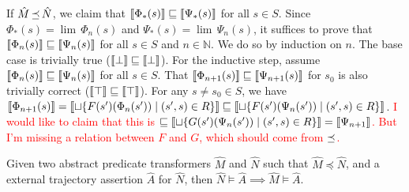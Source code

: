 If $\hat M \operatorname{\preceq} \hat N$, we claim that $\llbracket\Phi_{*}(s)\rrbracket \sqsubseteq \llbracket\Psi_{*}(s)\rrbracket$ for all $s \in S$. Since $\Phi_{*}(s) = \lim \, \Phi_{n}(s)$ and $\Psi_{*}(s) = \lim \, \Psi_{n}(s)$, it suffices to prove that $\llbracket\Phi_{n}(s)\rrbracket \sqsubseteq \llbracket\Psi_{n}(s)\rrbracket$ for all $s \in S$ and $n \in \mathbb{N}$. We do so by induction on $n$. The base case is trivially true ($\llbracket\bot\rrbracket \sqsubseteq \llbracket\bot\rrbracket$). For the inductive step, assume $\llbracket\Phi_{n}(s)\rrbracket \sqsubseteq \llbracket\Psi_{n}(s)\rrbracket$ for all $s \in S$. That $\llbracket\Phi_{n+1}(s)\rrbracket \sqsubseteq \llbracket\Psi_{n+1}(s)\rrbracket$ for $s_{0}$ is also trivially correct ($\llbracket\top\rrbracket \sqsubseteq \llbracket\top\rrbracket$). For any $s \neq s_{0} \in S$, we have $\llbracket\Phi_{n+1}(s)\rrbracket = \llbracket\sqcup \{ F(s')(\Phi_{n}(s')) \mid (s',s) \in R \}\rrbracket \sqsubseteq \llbracket\sqcup \{ F(s')(\Psi_{n}(s')) \mid (s',s) \in R \}\rrbracket$. \textcolor{red}{I would like to claim that this is $\sqsubseteq \llbracket\sqcup \{ G(s')(\Psi_{n}(s')) \mid (s',s) \in R \}\rrbracket = \llbracket\Psi_{n+1}\rrbracket$. But I'm missing a relation between $F$ and $G$, which should come from $\operatorname{\preceq}$.}

\begin{theorem}
Given two abstract predicate transformers $\hat M$ and $\hat N$ such that $\hat M \preceq \hat N$, and a external trajectory assertion $\hat A$ for $\hat N$, then $\hat N \models \hat A \implies \hat M \models \hat A$.
\end{theorem}

